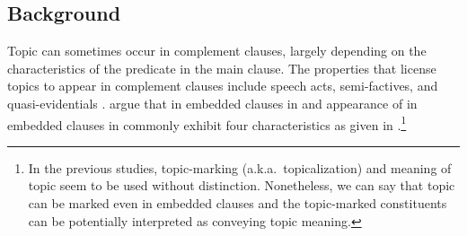 



\subsection{Background}
\label{10:ssec:embedded:background}




Topic can sometimes occur in complement clauses,
largely depending on the characteristics of the predicate in the main
clause.  The properties that license topics to appear in complement
clauses include speech acts, semi-factives, and quasi-evidentials
\citep{roberts:11}.  \citet{maki:etal:99} argue that 
 in embedded clauses in  and appearance of \wa in
embedded clauses in  commonly exhibit four
characteristics as given in .\footnote{In the previous
  studies, topic-marking (a.k.a.\ topicalization) and meaning of topic
  seem to be used without distinction. Nonetheless, we can say that
  topic can be marked even in embedded clauses and the topic-marked
  constituents can be potentially interpreted as conveying topic
  meaning.}



